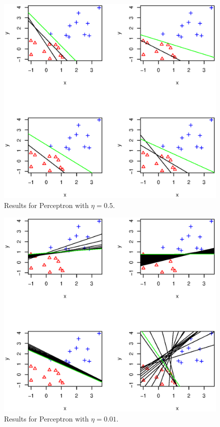\documentclass{article}
\begin{document}
\begin{figure}[htb]
	\centering
	\includegraphics[width=6.5in]{plots/perceptron_0.50.eps}
	\caption{Results for Perceptron with $\eta=0.5$.}
	\label{plot:perceptron-0.5}
\end{figure}

\begin{figure}[htb]
	\centering
	\includegraphics[width=6.5in]{plots/perceptron_0.01.eps}
	\caption{Results for Perceptron with $\eta=0.01$.}
	\label{plot:perceptron-0.01}
\end{figure}
\end{document}
